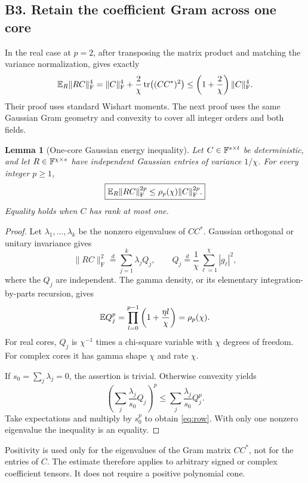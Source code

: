 \documentclass[11pt]{article}
\numberwithin{equation}{section}
\newtheorem{lemma}[theorem]{Lemma}
\theoremstyle{definition}\newtheorem{definition}[theorem]{Definition}
\theoremstyle{remark}\newtheorem{remark}[theorem]{Remark}
\newcommand{\tr}{\operatorname{tr}}\newcommand{\Ent}{\operatorname{Ent}}
\newcommand{\norm}[1]{\lVert#1\rVert}\newcommand{\ip}[2]{\langle#1,#2\rangle}
\begin{document}
\subsection{B3. Retain the coefficient Gram across one core}
In the real case at $p=2$, after transposing the matrix product and matching the
variance normalization, \cite[Lemma~4]{RR2020} gives exactly
\[
 \E_R\norm{RC}_{\mathrm F}^{4}
 =\norm C_{\mathrm F}^{4}+\frac{2}{\chi}\tr\bigl((CC^*)^2\bigr)
 \le\left(1+\frac2\chi\right)\norm C_{\mathrm F}^{4}.
\]
Their proof uses standard Wishart moments. The next proof uses the same
Gaussian Gram geometry and convexity to cover all integer orders and both fields.
\begin{lemma}[One-core Gaussian energy inequality]\label{lem:row}
Let $C\in\mathbb F^{s\times t}$ be deterministic, and let
$R\in\mathbb F^{\chi\times s}$ have independent Gaussian entries of variance $1/\chi$.
For every integer $p\ge1$,
\begin{equation}\label{eq:row}
 \boxed{\displaystyle\E_R\norm{RC}_{\mathrm F}^{2p}
 \le\rho_p(\chi)\norm C_{\mathrm F}^{2p}.}
\end{equation}
Equality holds when $C$ has rank at most one.
\end{lemma}
\begin{proof}
Let $\lambda_1,\ldots,\lambda_k$ be the nonzero eigenvalues of $CC^*$.
Gaussian orthogonal or unitary invariance gives
\[
 \norm{RC}_{\mathrm F}^2\stackrel d=\sum_{j=1}^k\lambda_jQ_j,
 \qquad Q_j\stackrel d=\frac1\chi\sum_{\ell=1}^{\chi}|g_\ell|^2,
\]
where the $Q_j$ are independent. The gamma density, or its elementary
integration-by-parts recursion, gives
\begin{equation}\label{eq:Qmoments}
 \mathbb E Q_j^p=\prod_{l=0}^{p-1}\left(1+\frac{\eta l}{\chi}\right)
 =\rho_p(\chi).
\end{equation}
For real cores, $Q_j$ is $\chi^{-1}$ times a chi-square variable with $\chi$
degrees of freedom. For complex cores it has gamma shape $\chi$ and rate $\chi$.

If $s_0=\sum_j\lambda_j=0$, the assertion is trivial. Otherwise convexity yields
\[
 \left(\sum_j\frac{\lambda_j}{s_0}Q_j\right)^p
 \le\sum_j\frac{\lambda_j}{s_0}Q_j^p.
\]
Take expectations and multiply by $s_0^p$ to obtain \eqref{eq:row}.
With only one nonzero eigenvalue the inequality is an equality.
\end{proof}

Positivity is used only for the eigenvalues of the Gram matrix $CC^*$, not for
the entries of $C$. The estimate therefore applies to arbitrary signed or
complex coefficient tensors. It does not require a positive polynomial cone.
\end{document}
